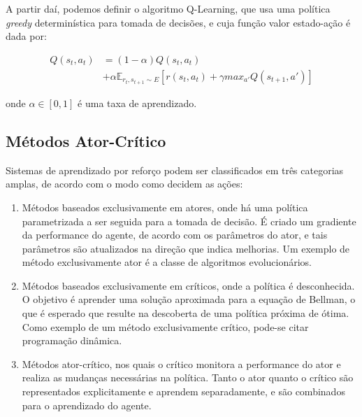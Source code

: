 \documentclass[twoside,conference,a4paper]{IEEEtran}
\begin{document}
A partir daí, podemos definir o algoritmo Q-Learning, que usa uma política \textit{greedy} determinística para tomada de decisões, e cuja função valor estado-ação é dada por:

\begin{equation}
\begin{split}
Q(s_t,a_t) & = (1-\alpha)Q(s_t,a_t) \\
& + \alpha\mathbb{E}_{r_t,s_{t+1}{\sim}E}[r(s_t,a_t)+\gamma max_{a'}Q(s_{t+1},a')]
\end{split}
\end{equation}

onde $\alpha \in [0,1]$ é uma taxa de aprendizado.

\subsection{Métodos Ator-Crítico}

Sistemas de aprendizado por reforço podem ser classificados em três categorias amplas, de acordo com o modo como decidem as ações:

\begin{enumerate}[label={\alph*)}]
\item Métodos baseados exclusivamente em atores, onde há uma política parametrizada a ser seguida para a tomada de decisão. É criado um gradiente da performance do agente, de acordo com os parâmetros do ator, e tais parâmetros são atualizados na direção que indica melhorias. Um exemplo de método exclusivamente ator é a classe de algoritmos evolucionários. 
\item Métodos baseados exclusivamente em críticos, onde a política é desconhecida. O objetivo é aprender uma solução aproximada para a equação de Bellman, o que é esperado que resulte na descoberta de uma política próxima de ótima. Como exemplo de um método exclusivamente crítico, pode-se citar programação dinâmica.
\item Métodos ator-crítico, nos quais o crítico monitora a performance do ator e realiza as mudanças necessárias na política. Tanto o ator quanto o crítico são representados explicitamente e aprendem separadamente, e são combinados para o aprendizado do agente.
\end{enumerate}
\end{document}
